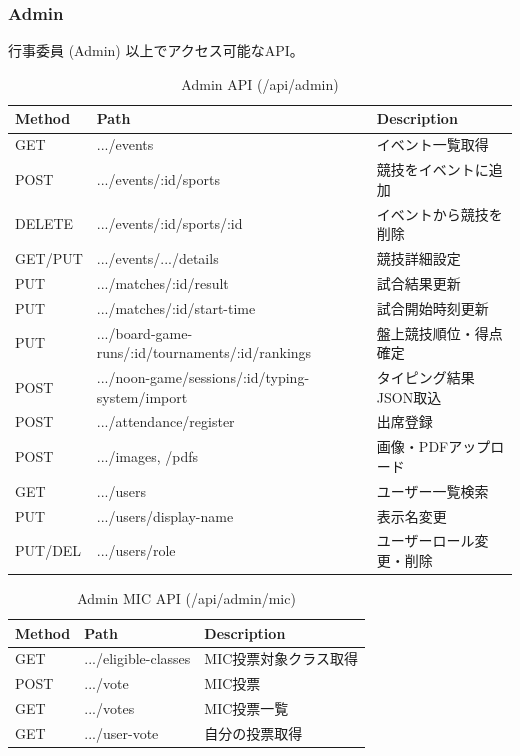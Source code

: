\documentclass[paper=a4, fontsize=11pt]{jlreq}
\begin{document}
\subsubsection{Admin}
行事委員 (Admin) 以上でアクセス可能なAPI。

\begin{table}[H]
    \centering
    \caption{Admin API (/api/admin)}
    \begin{tabularx}{\textwidth}{|l|l|X|}
        \toprule
        Method & Path & Description \\
        \midrule
        GET & .../events & イベント一覧取得 \\
        POST & .../events/:id/sports & 競技をイベントに追加 \\
        DELETE & .../events/:id/sports/:id & イベントから競技を削除 \\
        GET/PUT & .../events/.../details & 競技詳細設定 \\
        PUT & .../matches/:id/result & 試合結果更新 \\
        PUT & .../matches/:id/start-time & 試合開始時刻更新 \\
        PUT & .../board-game-runs/:id/tournaments/:id/rankings & 盤上競技順位・得点確定 \\
        POST & .../noon-game/sessions/:id/typing-system/import & タイピング結果JSON取込 \\
        POST & .../attendance/register & 出席登録 \\
        POST & .../images, /pdfs & 画像・PDFアップロード \\
        GET & .../users & ユーザー一覧検索 \\
        PUT & .../users/display-name & 表示名変更 \\
        PUT/DEL & .../users/role & ユーザーロール変更・削除 \\
        \bottomrule
    \end{tabularx}
\end{table}

\begin{table}[H]
    \centering
    \caption{Admin MIC API (/api/admin/mic)}
    \begin{tabularx}{\textwidth}{|l|l|X|}
        \toprule
        Method & Path & Description \\
        \midrule
        GET & .../eligible-classes & MIC投票対象クラス取得 \\
        POST & .../vote & MIC投票 \\
        GET & .../votes & MIC投票一覧 \\
        GET & .../user-vote & 自分の投票取得 \\
        \bottomrule
    \end{tabularx}
\end{table}
\end{document}
